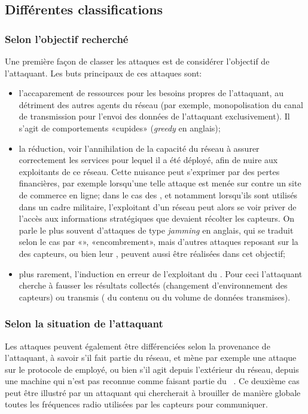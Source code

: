 \subsection{Différentes classifications}

    \subsubsection{Selon l'objectif recherché}
Une première façon de classer les attaques est de considérer l'objectif de l'attaquant.
Les buts principaux de ces attaques sont:
\begin{itemize}
    \item l'accaparement de ressources pour les besoins propres de l'attaquant, au détriment des autres agents du réseau (par exemple, monopolisation du canal de transmission pour l'envoi des données de l'attaquant exclusivement). Il s'agit de comportements «cupides» (\textit{greedy} en anglais);
    \item la réduction, voir l'annihilation de la capacité du réseau à assurer correctement les services pour lequel il a été déployé, afin de nuire aux exploitants de ce réseau. Cette nuisance peut s'exprimer par des pertes financières, par exemple lorsqu'une telle attaque est menée sur  contre un site de commerce en ligne; dans le cas des \rcsfs, et notamment lorsqu'ils sont utilisés dans un cadre militaire, l'exploitant d'un réseau peut alors se voir priver de l'accès aux informations stratégiques que devaient récolter les capteurs. On parle le plus souvent d'attaques de type \textit{jamming} en anglais, qui se traduit selon le cas par «», «encombrement», mais d'autres attaques reposant sur la  des capteurs, ou bien leur , peuvent aussi être réalisées dans cet objectif;
    \item plus rarement, l'induction en erreur de l'exploitant du \rc. Pour ceci l'attaquant cherche à fausser les résultats collectés (changement d'environnement des capteurs) ou transmis ( du contenu ou du volume de données transmises).
\end{itemize}

    \subsubsection{Selon la situation de l'attaquant}
    Les attaques peuvent également être différenciées selon la provenance de l'attaquant, à savoir s'il fait partie du réseau, et mène par exemple une attaque sur le protocole de  employé, ou bien s'il agit depuis l'extérieur du réseau, depuis une machine qui n'est pas reconnue comme faisant partie du \rc~\cite{SZFDXC14}.
Ce deuxième cas peut être illustré par un attaquant qui chercherait à brouiller de manière globale toutes les fréquences radio utilisées par les capteurs pour communiquer.

